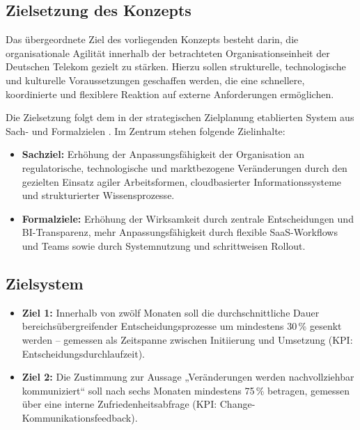 \documentclass[12pt,a4paper]{article}
\begin{document}
	
\subsection{Zielsetzung des Konzepts}

Das übergeordnete Ziel des vorliegenden Konzepts besteht darin, die organisationale Agilität innerhalb der betrachteten Organisationseinheit der Deutschen Telekom gezielt zu stärken. Hierzu sollen strukturelle, technologische und kulturelle Voraussetzungen geschaffen werden, die eine schnellere, koordinierte und flexiblere Reaktion auf externe Anforderungen ermöglichen.

\noindent Die Zielsetzung folgt dem in der strategischen Zielplanung etablierten System aus Sach- und Formalzielen \parencite{StelzerDirk1962-2011I:GA}. Im Zentrum stehen folgende Zielinhalte:

\begin{itemize}
	\item \textbf{Sachziel:} Erhöhung der Anpassungsfähigkeit der Organisation an regulatorische, technologische und marktbezogene Veränderungen durch den gezielten Einsatz agiler Arbeitsformen, cloudbasierter Informationssysteme und strukturierter Wissensprozesse.
	\item \textbf{Formalziele:} Erhöhung der Wirksamkeit durch zentrale Entscheidungen und BI-Transparenz, mehr Anpassungsfähigkeit durch flexible SaaS-Workflows und Teams sowie durch Systemnutzung und schrittweisen Rollout.
\end{itemize}



\subsection{Zielsystem}\label{sec:zielsystem}

\begin{itemize}
	\item \textbf{Ziel 1:} Innerhalb von zwölf Monaten soll die durchschnittliche Dauer bereichsübergreifender Entscheidungsprozesse um mindestens 30\,\% gesenkt werden – gemessen als Zeitspanne zwischen Initiierung und Umsetzung (KPI: Entscheidungsdurchlaufzeit).
	
	\item \textbf{Ziel 2:} Die Zustimmung zur Aussage „Veränderungen werden nachvollziehbar kommuniziert“ soll nach sechs Monaten mindestens 75\,\% betragen, gemessen über eine interne Zufriedenheitsabfrage (KPI: Change-Kommunikationsfeedback).
\end{itemize}
\end{document}

